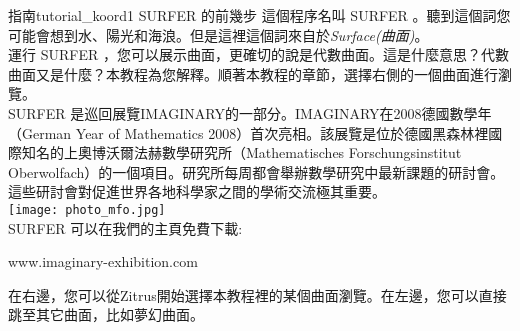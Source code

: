 \begin{surferIntroPage}{指南}{tutorial_koord1}{ SURFER 的前幾步}
這個程序名叫 SURFER 。聽到這個詞您可能會想到水、陽光和海浪。但是這裡這個詞來自於\textit{Surface(曲面)}。
\\

運行 SURFER ，您可以展示曲面，更確切的說是代數曲面。這是什麼意思？代數曲面又是什麼？本教程為您解釋。順著本教程的章節，選擇右側的一個曲面進行瀏覽。\\
 SURFER 是巡回展覽IMAGINARY的一部分。IMAGINARY在2008德國數學年（German Year of Mathematics 2008）首次亮相。該展覽是位於德國黑森林裡國際知名的上奧博沃爾法赫數學研究所（Mathematisches Forschungsinstitut Oberwolfach）的一個項目。研究所每周都會舉辦數學研究中最新課題的研討會。這些研討會對促進世界各地科學家之間的學術交流極其重要。\\
\vspace{0.2cm} \hspace{3.5cm}\texttt{[image: photo\_mfo.jpg]}\\
 SURFER 可以在我們的主頁免費下載: \\
\begin{centering}
www.imaginary-exhibition.com\\
\end{centering}
 \vspace{0.2cm}
在右邊，您可以從Zitrus開始選擇本教程裡的某個曲面瀏覽。在左邊，您可以直接跳至其它曲面，比如夢幻曲面。
\end{surferIntroPage}
